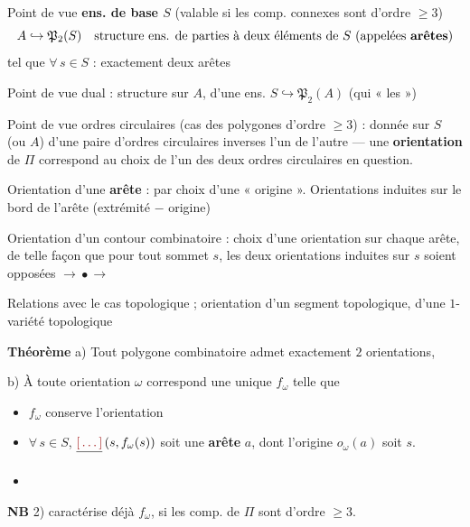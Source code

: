 \documentclass[11pt,a4paper]{article}
\begin{document}
  Point de vue
\textbf{ens. de base $S$} (valable si les comp. connexes sont d'ordre
$\geqslant 3$)
\[
  A \hookrightarrow \mathfrak{P}_2(S) \quad
  \text{structure ens. de parties à deux éléments de } S
  \ (\text{appelées \textbf{arêtes}})
\]
tel que $\forall\, s \in S$  : exactement deux arêtes

Point de vue dual : structure sur $A$, d'une ens.
$S \hookrightarrow \mathfrak{P}_2(A)$ (qui \ill{} « les
 »)

Point de vue ordres circulaires (cas des polygones d'ordre $\geqslant 3$) :
donnée sur $S$ (ou $A$) d'une paire d'ordres circulaires  inverses l'un de l'autre --- une
\textbf{orientation} de $\Pi$ correspond au choix de l'un des deux ordres
circulaires en question.



Orientation d'une \textbf{arête} : par choix d'une « origine ».
Orientations induites sur le bord de l'arête (extrémité $-$ origine)

Orientation d'un contour combinatoire : choix d'une orientation sur chaque
arête, de telle façon que pour tout sommet $s$, les deux orientations induites
sur $s$ soient opposées \quad $\longrightarrow\!\bullet\!\longrightarrow$

\struck{\ill{}} Relations avec le cas topologique ; orientation d'un segment
topologique, d'une $1$-variété topologique

\textbf{Théorème} a) Tout \struck{\ill{}} polygone combinatoire admet
exactement $2$ orientations, \struck{\ill{}} 

b) À toute orientation $\omega$  correspond une unique
 $f_\omega$ telle que
\begin{itemize}
  \item[1)] $f_\omega$ conserve l'orientation
  \item[2)] $\forall\, s \in S$, $\struck{\ill{}}\,(s, f_\omega(s))$ soit une
    \textbf{arête} $a$,  dont l'origine $o_\omega(a)$ soit $s$.
  \item[\struck{c)}] \struck{\ill{}}
\end{itemize}
\textbf{NB} 2) caractérise déjà $f_\omega$, si les comp. de $\Pi$ sont d'ordre
$\geqslant 3$.
\end{document}
